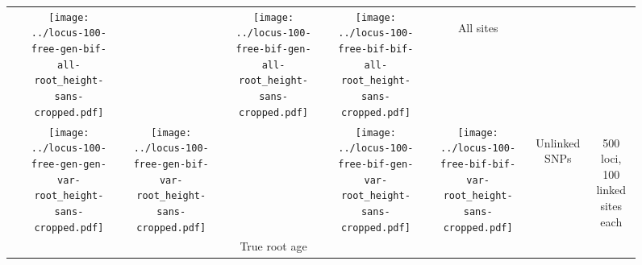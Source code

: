 \documentclass[border=10pt,varwidth=30cm]{standalone}
\begin{document}
\begin{figure}
\begin{tabular}{@{}cccccccc@{}}
        & \texttt{[image: ../locus-100-free-gen-bif-all-root\_height-sans-cropped.pdf]}
        &
        & \texttt{[image: ../locus-100-free-bif-gen-all-root\_height-sans-cropped.pdf]}
        & \texttt{[image: ../locus-100-free-bif-bif-all-root\_height-sans-cropped.pdf]}
        & \multicolumn{1}{c|}{\multirow{1}{*}[9em]{\begin{sideways}\Large All sites\end{sideways}}}
        & \\
        & \texttt{[image: ../locus-100-free-gen-gen-var-root\_height-sans-cropped.pdf]}
        & \texttt{[image: ../locus-100-free-gen-bif-var-root\_height-sans-cropped.pdf]}
        &
        & \texttt{[image: ../locus-100-free-bif-gen-var-root\_height-sans-cropped.pdf]}
        & \texttt{[image: ../locus-100-free-bif-bif-var-root\_height-sans-cropped.pdf]}
        & \multicolumn{1}{c|}{\multirow{1}{*}[10em]{\begin{sideways}\Large Unlinked SNPs\end{sideways}}}
        & \multirow{2}{*}[23em]{\begin{sideways}\LARGE 500 loci, 100 linked sites each\end{sideways}} \\
        & \multicolumn{5}{c}{\Large True root age} & & \\
    \end{tabular}
\end{figure}
\end{document}
